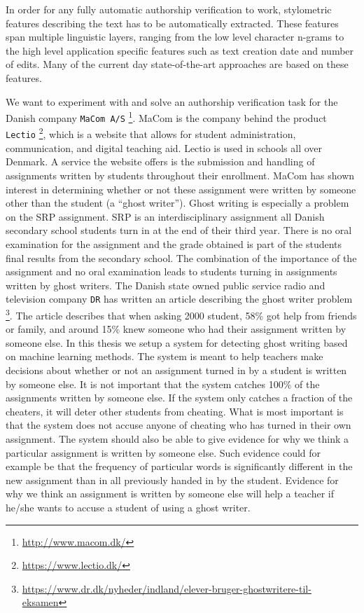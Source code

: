 In order for any fully automatic authorship verification to work, stylometric
features describing the text has to be automatically extracted. These features
span multiple linguistic layers, ranging from the low level character n-grams
to the high level application specific features such as text creation date and
number of edits. Many of the current day state-of-the-art approaches are based
on these features.


We want to experiment with and solve an authorship verification task for the
Danish company \texttt{MaCom A/S} \footnote{\url{http://www.macom.dk/}}.
MaCom is the company behind the product \texttt{Lectio}
\footnote{\url{https://www.lectio.dk/}}, which is a website that allows for
student administration, communication, and digital teaching aid. Lectio is used
in schools all over Denmark. A service the website offers is the submission
and handling of assignments written by students throughout their enrollment.
MaCom has shown interest in determining whether or not these assignment
were written by someone other than the student (a ``ghost writer''). Ghost
writing is especially a problem on the \gls{SRP} assignment. \gls{SRP} is
an interdisciplinary assignment all Danish secondary school students turn
in at the end of their third year. There is no oral examination for the
assignment and the grade obtained is part of the students final results from
the secondary school. The combination of the importance of the assignment
and no oral examination leads to students turning in assignments written by
ghost writers. The Danish state owned public service radio and television
company \texttt{DR} has written an article describing the ghost writer problem
\footnote{\url{https://www.dr.dk/nyheder/indland/elever-bruger-ghostwritere-til-
eksamen}}. The article describes that when asking 2000 student, 58\% got help
from friends or family, and around 15\% knew someone who had their assignment
written by someone else. In this thesis we setup a system for detecting ghost
writing based on machine learning methods. The system is meant to help teachers
make decisions about whether or not an assignment turned in by a student is
written by someone else. It is not important that the system catches 100\% of
the assignments written by someone else. If the system only catches a fraction
of the cheaters, it will deter other students from cheating. What is most
important is that the system does not accuse anyone of cheating who has turned
in their own assignment. The system should also be able to give evidence for why
we think a particular assignment is written by someone else. Such evidence could
for example be that the frequency of particular words is significantly different
in the new assignment than in all previously handed in by the student. Evidence
for why we think an assignment is written by someone else will help a teacher if
he/she wants to accuse a student of using a ghost writer.


